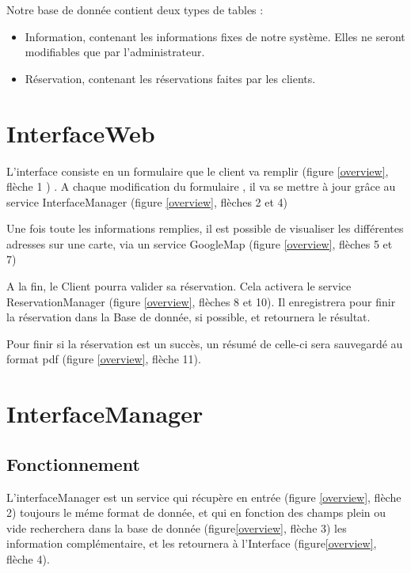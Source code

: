 		Notre base de donnée contient deux types de tables :
		
		\begin{itemize}
		  \item Information, contenant les informations fixes de notre système. Elles
		  ne seront modifiables que par l'administrateur. 
		  \item Réservation, contenant les réservations faites par les clients.
		\end{itemize}
			
	\section{InterfaceWeb}
		
		L'interface consiste en un formulaire que le client va remplir
		(figure \ref{overview}, flèche 1 ) . A chaque modification du formulaire
		, il va se mettre à jour grâce au service InterfaceManager (figure
		\ref{overview}, flèches 2 et 4)
		
		Une fois toute les informations remplies, il est possible de visualiser les
		différentes adresses sur une carte, via un service GoogleMap (figure
		\ref{overview}, flèches 5 et 7)
		
		A la fin, le Client pourra valider sa réservation. Cela activera le service
		ReservationManager (figure \ref{overview}, flèches 8 et 10). Il enregistrera
		pour finir la réservation dans la Base de donnée, si possible, et retournera
		le résultat.
		
		Pour finir si la réservation est un succès, un résumé de celle-ci sera
		sauvegardé au format pdf (figure \ref{overview}, flèche 11).
	
	\section{InterfaceManager}
	
		\subsection{Fonctionnement}
	
			L'interfaceManager est un service qui récupère en entrée (figure
			\ref{overview}, flèche 2) toujours le méme format de donnée, et qui en
			fonction des champs plein ou vide recherchera dans la base de donnée
			(figure\ref{overview}, flèche 3) les information complémentaire, et les
			retournera à l'Interface (figure\ref{overview}, flèche 4).
		
